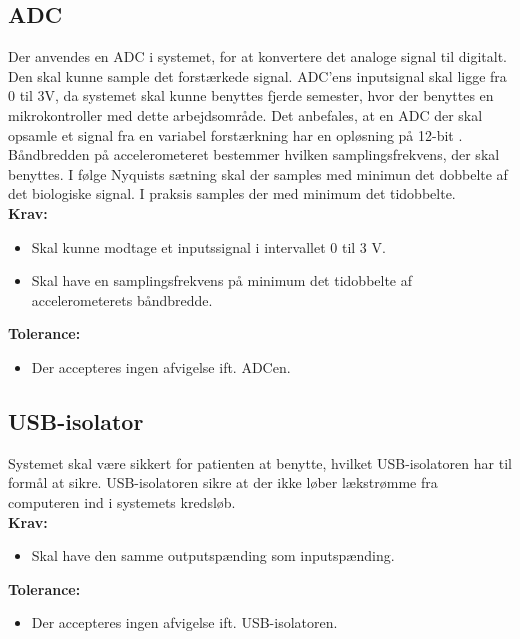 \subsection{ADC}
Der anvendes en ADC i systemet, for at konvertere det analoge signal til digitalt. Den skal kunne sample det forstærkede signal. ADC'ens inputsignal skal ligge fra 0 til 3V, da systemet skal kunne benyttes fjerde semester, hvor der benyttes en mikrokontroller med dette arbejdsområde. Det anbefales, at en ADC der skal opsamle et signal fra en variabel forstærkning har en opløsning på 12-bit \cite{Zouridakis2003}. Båndbredden på accelerometeret bestemmer hvilken samplingsfrekvens, der skal benyttes. I følge Nyquists sætning skal der samples med minimun det dobbelte af det biologiske signal. I praksis samples der med minimum det tidobbelte. \\
\textbf{Krav:}
\begin{itemize}
\item Skal kunne modtage et inputssignal i intervallet 0 til 3 V.
\item Skal have en samplingsfrekvens på minimum det tidobbelte af accelerometerets båndbredde.
\end{itemize}
\textbf{Tolerance:}
\begin{itemize}
\item Der accepteres ingen afvigelse ift. ADCen.
\end{itemize}
\subsection{USB-isolator}
Systemet skal være sikkert for patienten at benytte, hvilket USB-isolatoren har til formål at sikre. USB-isolatoren sikre at der ikke løber lækstrømme fra computeren ind i systemets kredsløb.\\
\textbf{Krav:}
\begin{itemize}
\item Skal have den samme outputspænding som inputspænding. 
\end{itemize}
\textbf{Tolerance:}
\begin{itemize}
\item Der accepteres ingen afvigelse ift. USB-isolatoren. 
\end{itemize}
